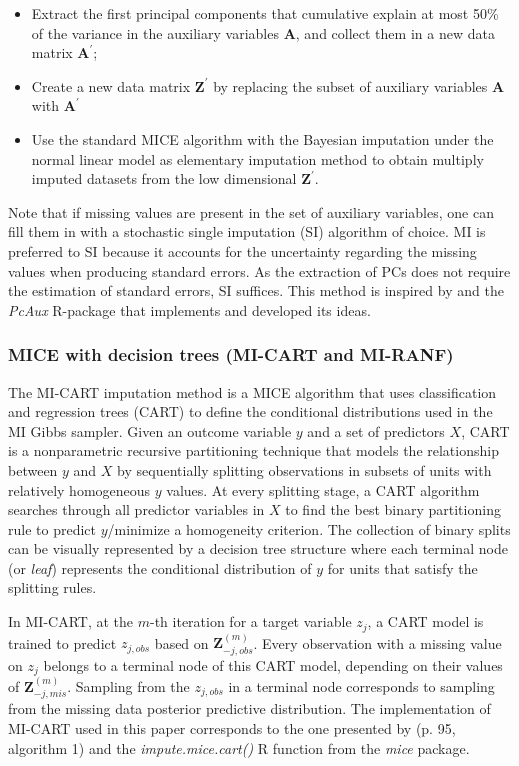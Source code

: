 	\begin{itemize}

	\item Extract the first principal components that cumulative explain at most 50\% of the variance 
		in the auxiliary variables $\bm{A}$, and collect them in a new data matrix $\bm{A}^{'}$;
	\item Create a new data matrix $\bm{Z}^{'}$ by replacing the subset of auxiliary variables $\bm{A}$ 
		with $\bm{A}^{'}$
	\item Use the standard MICE algorithm with the Bayesian imputation under the normal linear model 
		\citep[p. 68, algorithm 3.1]{vanBuuren:2012} as elementary imputation method to obtain multiply 
		imputed datasets from the low dimensional $\bm{Z}^{'}$.
	\end{itemize}

	Note that if missing values are present in the set of auxiliary variables, one can fill them in with a 
	stochastic single imputation (SI) algorithm of choice.
	MI is preferred to SI because it accounts for the uncertainty regarding the missing values when producing 
	standard errors.
	As the extraction of PCs does not require the estimation of standard errors, SI suffices.
	This method is inspired by \cite{howardEtAl:2015} and the \emph{PcAux} R-package \citep{PcAux} that 
	implements and developed its ideas.
	
\subsubsection{MICE with decision trees (MI-CART and MI-RANF)}
	The MI-CART imputation method \citep{burgetteReiter:2010} is a MICE algorithm that uses classification and regression 
	trees (CART) to define the conditional distributions used in the MI Gibbs sampler.
	Given an outcome variable $y$ and a set of predictors $X$, CART is a nonparametric recursive partitioning technique 
	that models the relationship between $y$ and $X$ by sequentially splitting observations in subsets of units with 
	relatively homogeneous $y$ values.
	At every splitting stage, a CART algorithm searches through all predictor variables in $X$ to find the best binary 
	partitioning rule to predict $y$/minimize a homogeneity criterion.
	The collection of binary splits can be visually represented by a decision tree structure where each terminal 
	node (or \emph{leaf}) represents the conditional distribution of $y$ for units that satisfy the splitting rules.

	In MI-CART, at the $m$-th iteration for a target variable $z_j$, a CART model is trained to predict $z_{j, obs}$ based on 
	$\bm{Z}_{-j, obs}^{(m)}$.
	Every observation with a missing value on $z_j$ belongs to a terminal node of this CART model, depending on their values of
	$\bm{Z}_{-j, mis}^{(m)}$. 
	Sampling from the $z_{j, obs}$ in a terminal node corresponds to sampling from the missing data posterior predictive
	distribution.
	The implementation of MI-CART used in this paper corresponds to the one presented by \cite{dooveEtAl:2014}
	(p. 95, algorithm 1) and the \emph{impute.mice.cart()} R function from the \emph{mice} package.

